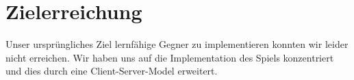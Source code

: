 \section{Zielerreichung}
Unser ursprüngliches Ziel lernfähige Gegner zu implementieren konnten wir leider nicht erreichen. Wir haben uns auf die Implementation des Spiels konzentriert und 
dies durch eine Client-Server-Model erweitert. 
